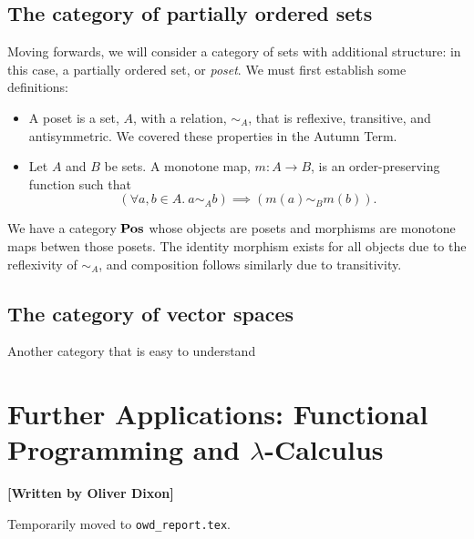 \documentclass[10pt,a4paper,reqno]{amsart}
\numberwithin{figure}{section}
\begin{document}
\subsection{The category of partially ordered sets}
Moving forwards, we will consider a category of sets with additional structure:
in this case, a partially ordered set, or \emph{poset}. We must first establish
some definitions:
\begin{itemize}
        \item A poset is a set, $A$, with a relation, $\sim_A$, that is
        reflexive, transitive, and antisymmetric. We covered these properties in
        the Autumn Term.
        \item Let $A$ and $B$ be sets. A monotone map, $m \colon A \to B$, is an
        order-preserving function such that
        \begin{equation*}
                ( \forall a, b \in A. \  a \sim_A b )
                \implies ( m(a) \sim_B m(b) ).
        \end{equation*}
\end{itemize}
We have a category $\operatorname{\mathbf{Pos}}$ whose objects are posets and morphisms are monotone
maps betwen those posets. The identity morphism exists for all objects due to
the reflexivity of $\sim_A$, and composition follows similarly due to
transitivity.

\subsection{The category of vector spaces}
Another category that is easy to understand

\section{Further Applications: %
        Functional Programming and \texorpdfstring{$\lambda$}{Lambda}-Calculus}
\begin{flushright}
        \textbf{[Written by Oliver Dixon]}
\end{flushright}

\noindent Temporarily moved to \texttt{owd\_report.tex}.
\end{document}
